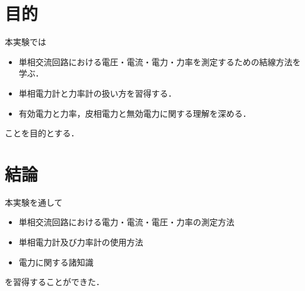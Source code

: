 \documentclass[11pt,dvipdfmx]{ujarticle}
\begin{document}
\begin{jikkenTitle}
 \end{jikkenTitle}

\section{目的}
本実験では
\begin{itemize}
	\item 単相交流回路における電圧・電流・電力・力率を測定するための結線方法を学ぶ．
	\item 単相電力計と力率計の扱い方を習得する．
	\item 有効電力と力率，皮相電力と無効電力に関する理解を深める．
\end{itemize}
ことを目的とする．






\clearpage
\section{結論}
本実験を通して
\begin{itemize}
	\item 単相交流回路における電力・電流・電圧・力率の測定方法
	\item 単相電力計及び力率計の使用方法
	\item 電力に関する諸知識
\end{itemize}
を習得することができた．

\newpage
\printbibliography[title=参考文献]
\end{document}
